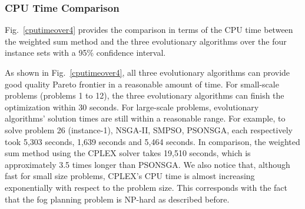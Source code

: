 \documentclass[10pt,journal,compsoc]{IEEEtran}
\newcommand{\Fig}[1]{Fig.~\ref{#1}}
\begin{document}
\begin{table}[ht]
\centering
\caption{Delay gap comparison (over four instance sets)}\label{delaygapss}
\end{table}


\subsubsection{CPU Time Comparison}
\Fig{cputimeover4} provides the comparison in terms of the CPU time between the weighted sum method and the three evolutionary algorithms over the four instance sets with a 95\% confidence interval. 

As shown in \Fig{cputimeover4}, all three evolutionary algorithms can provide good quality Pareto frontier in a reasonable amount of time. For small-scale problems (problems 1 to 12), the three evolutionary algorithms can finish the optimization within 30 seconds. For large-scale problems, evolutionary algorithms' solution times are still within a reasonable range. For example, to solve problem 26 (instance-1), NSGA-II, SMPSO, PSONSGA, each respectively took 5,303 seconds, 1,639 seconds and 5,464 seconds. In comparison, the weighted sum method using the CPLEX solver takes 19,510 seconds, which is approximately 3.5 times longer than PSONSGA. We also notice that, although fast for small size problems, CPLEX's CPU time is almost increasing exponentially with respect to the problem size. This corresponds with the fact that the fog planning problem is NP-hard as described before.
\end{document}
